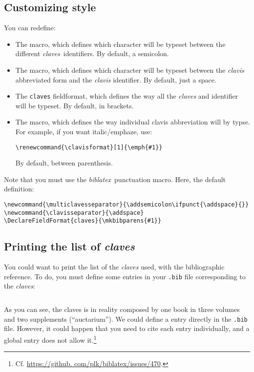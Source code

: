 \documentclass{ltxdockit}[2011/03/25]
\newcommand{\biblatex}{\emph{biblatex}\xspace}
\newcommand{\claves}{\emph{claves}\xspace}
\newcommand{\clavis}{\emph{clavis}\xspace}
\begin{document}
 \subsection{Customizing style}
You can  redefine:
\begin{itemize}
  \item The  macro, which defines which character will be typeset between the different \claves\ identifiers. By default, a semicolon.
  \item The  macro, which defines which character will be typeset between the \clavis abbreviated form and the \clavis identifier. By default, just a space.
  \item The \verb+claves+ fieldformat, which defines the way all the \claves and identifier will be typeset. By default, in brackets.
  \item The  macro, which defines the way individual clavis abbreviation will by typse. For example, if you want italic/emphaze, use:
  \begin{verbatim}
\renewcommand{\clavisformat}[1]{\emph{#1}}
  \end{verbatim}
 By default, between parenthesis.
\end{itemize}
Note that you must use the \biblatex\ punctuation macro.
Here, the default definition:
\begin{verbatim}
\newcommand{\multiclavesseparator}{\addsemicolon\ifpunct{\addspace}{}}
\newcommand{\clavisseparator}{\addspace}
\DeclareFieldFormat{claves}{\mkbibparens{#1}}
\end{verbatim}
\subsection{Printing the list of \claves}

You could want to print the list of the \claves used, with the bibliographic reference.
 To do, you must define some entries in your \verb+.bib+ file corresponding to the \claves:
\inputminted{tex}{biblatex-claves-ref.bib}

As you can see, the  claves is in reality composed by one book in three volumes and two supplements (\enquote{auctarium}).
 We could define a  entry directly in the \verb+.bib+ file.
 However, it could happen that you need to cite each entry individually, and a global  entry does not allow it.\footnote{Cf. \url{https://github. com/plk/biblatex/issues/470}.}
\end{document}
